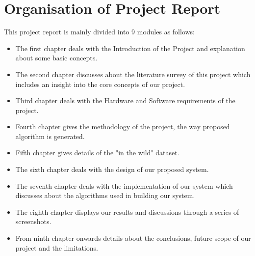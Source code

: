 \section{Organisation of Project Report}
This project report is mainly divided into 9 modules as follows:
\begin{itemize}
  \item The first chapter deals with the Introduction of the Project and explanation about some basic concepts.
  \item The second chapter discusses about the literature survey of this project which includes an insight into the core concepts of our project.
  \item Third chapter deals with the Hardware and Software requirements of the project.
  \item Fourth chapter gives the methodology of the project, the way proposed algorithm is generated.
  \item Fifth chapter gives details of the "in the wild" dataset.
  \item The sixth chapter deals with the design of our proposed system. 
  \item The seventh chapter deals with the implementation of our system which discusses about the algorithms used in building our system.
  \item The eighth chapter displays our results and discussions through a series of screenshots. 
  \item From ninth chapter onwards details about the conclusions, future scope of our project and the limitations. 
\end{itemize}


